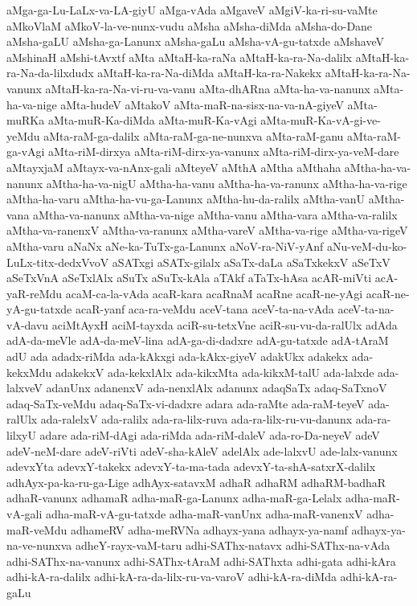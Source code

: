 {aMga-ga-Lu-LaLx-va-LA-giyU
aMga-vAda
aMgaveV
aMgiV-ka-ri-su-vaMte
aMkoVlaM
aMkoV-la-ve-nunx-vudu
aMsha
aMsha-diMda
aMsha-do-Dane
aMsha-gaLU
aMsha-ga-Lanunx
aMsha-gaLu
aMsha-vA-gu-tatxde
aMshaveV
aMshinaH
aMshi-tAvxtf
aMta
aMtaH-ka-raNa
aMtaH-ka-ra-Na-dalilx
aMtaH-ka-ra-Na-da-lilxdudx
aMtaH-ka-ra-Na-diMda
aMtaH-ka-ra-Nakekx
aMtaH-ka-ra-Na-vanunx
aMtaH-ka-ra-Na-vi-ru-va-vanu
aMta-dhARna
aMta-ha-va-nanunx
aMta-ha-va-nige
aMta-hudeV
aMtakoV
aMta-maR-na-sisx-na-va-nA-giyeV
aMta-muRKa
aMta-muR-Ka-diMda
aMta-muR-Ka-vAgi
aMta-muR-Ka-vA-gi-ve-yeMdu
aMta-raM-ga-dalilx
aMta-raM-ga-ne-nunxva
aMta-raM-ganu
aMta-raM-ga-vAgi
aMta-riM-dirxya
aMta-riM-dirx-ya-vanunx
aMta-riM-dirx-ya-veM-dare
aMtayxjaM
aMtayx-va-nAnx-gali
aMteyeV
aMthA
aMtha
aMthaha
aMtha-ha-va-nanunx
aMtha-ha-va-nigU
aMtha-ha-vanu
aMtha-ha-va-ranunx
aMtha-ha-va-rige
aMtha-ha-varu
aMtha-ha-vu-ga-Lanunx
aMtha-hu-da-ralilx
aMtha-vanU
aMtha-vana
aMtha-va-nanunx
aMtha-va-nige
aMtha-vanu
aMtha-vara
aMtha-va-ralilx
aMtha-va-ranenxV
aMtha-va-ranunx
aMtha-vareV
aMtha-va-rige
aMtha-va-rigeV
aMtha-varu
aNaNx
aNe-ka-TuTx-ga-Lanunx
aNoV-ra-NiV-yAnf
aNu-veM-du-ko-LuLx-titx-dedxVvoV
aSATxgi
aSATx-gilalx
aSaTx-daLa
aSaTxkekxV
aSeTxV
aSeTxVnA
aSeTxlAlx
aSuTx
aSuTx-kAla
aTAkf
aTaTx-hAsa
acAR-miVti
acA-yaR-reMdu
acaM-ca-la-vAda
acaR-kara
acaRnaM
acaRne
acaR-ne-yAgi
acaR-ne-yA-gu-tatxde
acaR-yanf
aca-ra-veMdu
aceV-tana
aceV-ta-na-vAda
aceV-ta-na-vA-davu
aciMtAyxH
aciM-tayxda
aciR-su-tetxVne
aciR-su-vu-da-ralUlx
adAda
adA-da-meVle
adA-da-meV-lina
adA-ga-di-dadxre
adA-gu-tatxde
adA-tAraM
adU
ada
adadx-riMda
ada-kAkxgi
ada-kAkx-giyeV
adakUkx
adakekx
ada-kekxMdu
adakekxV
ada-kekxlAlx
ada-kikxMta
ada-kikxM-talU
ada-lalxde
ada-lalxveV
adanUnx
adanenxV
ada-nenxlAlx
adanunx
adaqSaTx
adaq-SaTxnoV
adaq-SaTx-veMdu
adaq-SaTx-vi-dadxre
adara
ada-raMte
ada-raM-teyeV
ada-ralUlx
ada-ralelxV
ada-ralilx
ada-ra-lilx-ruva
ada-ra-lilx-ru-vu-danunx
ada-ra-lilxyU
adare
ada-riM-dAgi
ada-riMda
ada-riM-daleV
ada-ro-Da-neyeV
adeV
adeV-neM-dare
adeV-riVti
adeV-sha-kAleV
adelAlx
ade-lalxvU
ade-lalx-vanunx
adevxYta
adevxY-takekx
adevxY-ta-ma-tada
adevxY-ta-shA-satxrX-dalilx
adhAyx-pa-ka-ru-ga-Lige
adhAyx-satavxM
adhaR
adhaRM
adhaRM-badhaR
adhaR-vanunx
adhamaR
adha-maR-ga-Lanunx
adha-maR-ga-Lelalx
adha-maR-vA-gali
adha-maR-vA-gu-tatxde
adha-maR-vanUnx
adha-maR-vanenxV
adha-maR-veMdu
adhameRV
adha-meRVNa
adhayx-yana
adhayx-ya-namf
adhayx-ya-na-ve-nunxva
adheY-rayx-vaM-taru
adhi-SAThx-natavx
adhi-SAThx-na-vAda
adhi-SAThx-na-vanunx
adhi-SAThx-tAraM
adhi-SAThxta
adhi-gata
adhi-kAra
adhi-kA-ra-dalilx
adhi-kA-ra-da-lilx-ru-va-varoV
adhi-kA-ra-diMda
adhi-kA-ra-gaLu
}
